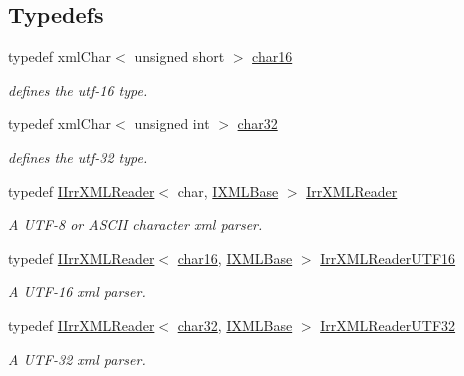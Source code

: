 \subsection*{Typedefs}
\begin{DoxyCompactItemize}
\item 
typedef xml\+Char$<$ unsigned short $>$ \hyperlink{namespaceirr_1_1io_a9140fe380f1a4e2fb4e114463e2d2838}{char16}
\begin{DoxyCompactList}\small\item\em defines the utf-\/16 type. \end{DoxyCompactList}\item 
typedef xml\+Char$<$ unsigned int $>$ \hyperlink{namespaceirr_1_1io_adfbb5748d02235670728f95ab89b69a4}{char32}
\begin{DoxyCompactList}\small\item\em defines the utf-\/32 type. \end{DoxyCompactList}\item 
typedef \hyperlink{classirr_1_1io_1_1IIrrXMLReader}{I\+Irr\+X\+M\+L\+Reader}$<$ char, \hyperlink{classirr_1_1io_1_1IXMLBase}{I\+X\+M\+L\+Base} $>$ \hyperlink{namespaceirr_1_1io_a1628edbb9d5d53f18c82d2a92b0ad27e}{Irr\+X\+M\+L\+Reader}
\begin{DoxyCompactList}\small\item\em A U\+T\+F-\/8 or A\+S\+C\+II character xml parser. \end{DoxyCompactList}\item 
typedef \hyperlink{classirr_1_1io_1_1IIrrXMLReader}{I\+Irr\+X\+M\+L\+Reader}$<$ \hyperlink{namespaceirr_1_1io_a9140fe380f1a4e2fb4e114463e2d2838}{char16}, \hyperlink{classirr_1_1io_1_1IXMLBase}{I\+X\+M\+L\+Base} $>$ \hyperlink{namespaceirr_1_1io_a5eb4094dfd0d509e0cd8a9d1dd30a5b9}{Irr\+X\+M\+L\+Reader\+U\+T\+F16}
\begin{DoxyCompactList}\small\item\em A U\+T\+F-\/16 xml parser. \end{DoxyCompactList}\item 
typedef \hyperlink{classirr_1_1io_1_1IIrrXMLReader}{I\+Irr\+X\+M\+L\+Reader}$<$ \hyperlink{namespaceirr_1_1io_adfbb5748d02235670728f95ab89b69a4}{char32}, \hyperlink{classirr_1_1io_1_1IXMLBase}{I\+X\+M\+L\+Base} $>$ \hyperlink{namespaceirr_1_1io_a70f411ff403636fb5c4e9becb090d5ec}{Irr\+X\+M\+L\+Reader\+U\+T\+F32}
\begin{DoxyCompactList}\small\item\em A U\+T\+F-\/32 xml parser. \end{DoxyCompactList}\item 

\end{DoxyCompactItemize}
